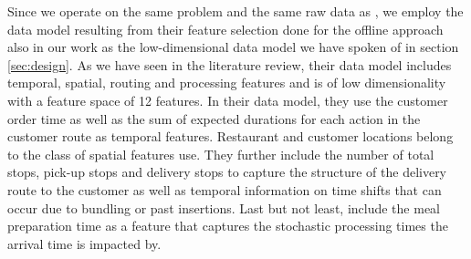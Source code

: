 Since we operate on the same problem and the same raw data as \cite{Hildebrandt2020_EAT}, we employ the data model resulting from their feature selection done for the offline approach also in our work as the low-dimensional data model we have spoken of in section \ref{sec:design}. As we have seen in the literature review, their data model includes temporal, spatial, routing and processing features and is of low dimensionality with a feature space of 12 features.
In their data model, they use the customer order time as well as the sum of expected durations for each action in the customer route as temporal features. Restaurant and customer locations belong to the class of spatial features \cite{Hildebrandt2020_EAT} use. They further include the number of total stops, pick-up stops and delivery stops to capture the structure of the delivery route to the customer as well as temporal information on time shifts that can occur due to bundling or past insertions. Last but not least, \cite{Hildebrandt2020_EAT} include the meal preparation time as a feature that captures the stochastic processing times the arrival time is impacted by.

